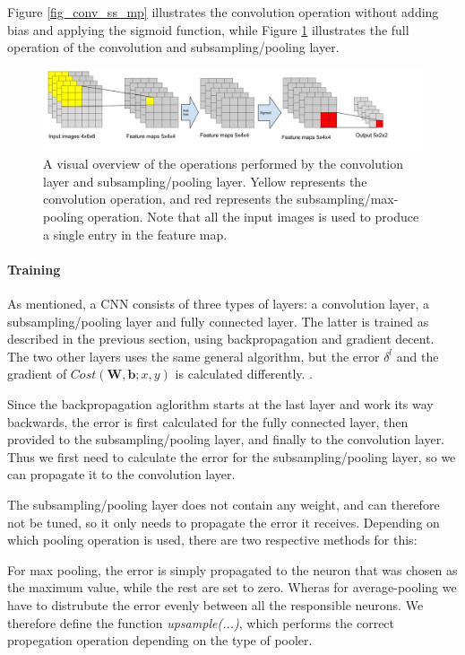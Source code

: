 Figure \ref{fig_conv_ss_mp} illustrates the convolution operation without adding bias and applying the sigmoid function, while Figure \ref{fig_visual_conv_ss_mp} illustrates the full operation of the convolution and subsampling/pooling layer. 

\begin{figure}[h!]
  \centering
      \includegraphics[width=1.3\textwidth]{Figures/Method/Convolution_subsample_pool}
  \caption{A visual overview of the operations performed by the convolution layer and subsampling/pooling layer. Yellow represents the convolution operation, and red represents the subsampling/max-pooling operation. Note that all the input images is used to produce a single entry in the feature map.}
  \label{fig_visual_conv_ss_mp}
\end{figure}



\paragraph{Training} \hfill \break
As mentioned, a CNN consists of three types of layers: a convolution layer, a subsampling/pooling layer and fully connected layer. The latter is trained as described in the previous section, using backpropagation and gradient decent. The two other layers uses the same general algorithm, but the error $ \delta^l $ and the gradient of $ Cost(\mathbf{W,b}; x, y) $ is calculated differently. . 

Since the backpropagation aglorithm starts at the last layer and work its way backwards, the error is first calculated for the fully connected layer, then provided to the subsampling/pooling layer, and finally to the convolution layer. Thus we first need to calculate the error for the subsampling/pooling layer, so we can propagate it to the convolution layer. 

The subsampling/pooling layer does not contain any weight, and can therefore not be tuned, so it only needs to propagate the error it receives. Depending on which pooling operation is used, there are two respective methods for this:

For max pooling, the error is simply propagated to the neuron that was chosen as the maximum value, while the rest are set to zero. Wheras for average-pooling we have to distrubute the error evenly between all the responsible neurons. We therefore define the function \textit{upsample(...)}, which performs the correct propegation operation depending on the type of pooler. 

